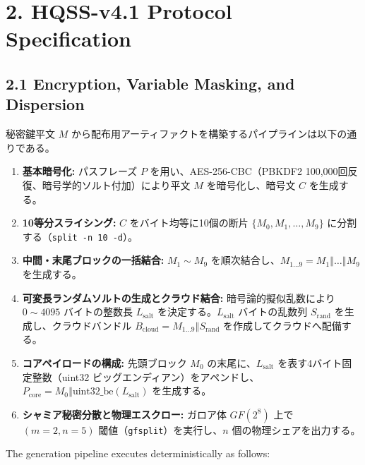 \documentclass[11pt,a4paper,titlepage]{article}
\newif\ifja
\begin{document}
\section{%
  \ifja 2. HQSS-v4.1 プロトコル詳細 \else 2. HQSS-v4.1 Protocol Specification \fi
}

\subsection{%
  \ifja 2.1 暗号化・可変ソルト注入・分散生成 \else 2.1 Encryption, Variable Masking, and Dispersion \fi
}
\ifja
秘密鍵平文 $M$ から配布用アーティファクトを構築するパイプラインは以下の通りである。
\begin{enumerate}
  \item \textbf{基本暗号化:} パスフレーズ $P$ を用い、AES-256-CBC（PBKDF2 100,000回反復、暗号学的ソルト付加）により平文 $M$ を暗号化し、暗号文 $C$ を生成する。
  \item \textbf{10等分スライシング:} $C$ をバイト均等に10個の断片 $\{M_0, M_1, \dots, M_9\}$ に分割する（\texttt{split -n 10 -d}）。
  \item \textbf{中間・末尾ブロックの一括結合:} $M_1 \sim M_9$ を順次結合し、$M_{1\dots9} = M_1 \mathbin{\Vert} \dots \mathbin{\Vert} M_9$ を生成する。
  \item \textbf{可変長ランダムソルトの生成とクラウド結合:} 暗号論的擬似乱数により $0 \sim 4095$ バイトの整数長 $L_{\text{salt}}$ を決定する。$L_{\text{salt}}$ バイトの乱数列 $S_{\text{rand}}$ を生成し、クラウドバンドル $B_{\text{cloud}} = M_{1\dots9} \mathbin{\Vert} S_{\text{rand}}$ を作成してクラウドへ配備する。
  \item \textbf{コアペイロードの構成:} 先頭ブロック $M_0$ の末尾に、$L_{\text{salt}}$ を表す4バイト固定整数（uint32 ビッグエンディアン）をアペンドし、$P_{\text{core}} = M_0 \mathbin{\Vert} \text{uint32\_be}(L_{\text{salt}})$ を生成する。
  \item \textbf{シャミア秘密分散と物理エスクロー:} ガロア体 $GF(2^8)$ 上で $(m=2, n=5)$ 閾値（\texttt{gfsplit}）を実行し、$n$ 個の物理シェアを出力する。
\end{enumerate}
\else
The generation pipeline executes deterministically as follows:
\end{document}
